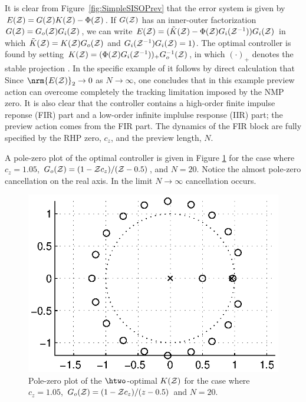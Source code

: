 It is clear from Figure~\ref{fig:SimpleSISOPrev} that the error system is given by $E(\mathcal{Z})=G(\mathcal{Z})K(\mathcal{Z})-\Phi(\mathcal{Z})$. If $G(\mathcal{Z})$ has an inner-outer factorization \cite{LimebeerGreen,ZDG} $G(\mathcal{Z})= G_o(\mathcal{Z}) G_i(\mathcal{Z})$, we can write $E(\mathcal{Z})= (\tilde{K}(\mathcal{Z}) -\Phi(\mathcal{Z})G_i(\mathcal{Z}^{-1}))G_i(\mathcal{Z})$ in which $\tilde{K}(\mathcal{Z})= K(\mathcal{Z}) G_o(\mathcal{Z})$ and
$G_i(\mathcal{Z}^{-1})G_i(\mathcal{Z})=1)$. The optimal controller is found by setting $K(\mathcal{Z}) = (\Phi(\mathcal{Z})G_i(\mathcal{Z}^{-1}))_+ G_o^{-1}(\mathcal{Z}) $, in which $(\cdot)_+$ denotes the stable projection \cite{LimebeerGreen,ZDG}. In the specific example of 
it follows by direct calculation that
%
Since $\nrm{E(\z)}_2\rightarrow 0$ as $N\rightarrow \infty$, one concludes that in this example preview action can overcome completely the tracking limitation
imposed by the NMP zero. It is also clear that the controller contains a high-order finite impulse reponse (FIR) part and a low-order infinite implulse response (IIR) part; the preview action comes from the FIR part. The dynamics of the FIR block are fully specified by the RHP zero, $c_z$, and the preview length, $N$.

A pole-zero plot of the optimal controller is given in Figure \ref{fig:PZforSISOPrevH2} for the case where $c_z=1.05$, $G_o(\mathcal{Z})=(1-\mathcal{Z} c_z)/(\mathcal{Z}-0.5)$, and $N=20$. Notice the almost pole-zero cancellation on the real axis. In the limit $N\rightarrow \infty$ cancellation occurs. 
\begin{figure}
\begin{center}
\includegraphics[width=0.7\columnwidth]{./diags/SimpleExamplePZPlot2.eps}
\end{center}
\caption{Pole-zero plot of the $\htwo$-optimal $K(\mathcal{Z})$ for the case where $c_z=1.05$, $G_o(\mathcal{Z})=(1-\mathcal{Z} c_z)/(z-0.5)$ and $N=20$.   }
\label{fig:PZforSISOPrevH2}
\end{figure}

